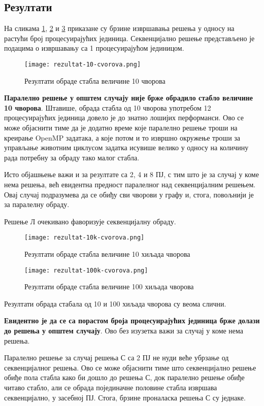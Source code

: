 \subsection{Резултати}

На сликама \ref{fig:rez10}, \ref{fig:rez10k} и \ref{fig:rez100k} приказане су брзине извршавања решења у односу на растући број процесуирајућих јединица.
Секвенцијално решење представљено је подацима о извршавању са 1 процесуирајућом јединицом.

\begin{figure}[]
    \centering
    \texttt{[image: rezultat-10-cvorova.png]}
    \caption{Резултати обраде стабла величине 10 чворова}
    \label{fig:rez10}
\end{figure}

\textbf{Паралелно решење у општем случају није брже обрадило стабло величине 10 чворова}.
Штавише, обрада стабла од 10 чворова употребом 12 процесуирајућих јединица довело је до знатно лошијих перформанси.
Ово се може објаснити тиме да је додатно време које паралелно решење троши на креирање OpenMP задатака, а које потом и то извршно окружење троши за
управљање животним циклусом задатка исувише велико у односу на количину рада потребну за обраду тако малог стабла.

Исто објашњење важи и за резултате са 2, 4 и 8 ПЈ, с тим што је за случај у коме нема решења, већ евидентна предност паралелног
над секвенцијалним решењем. Овај случај подразумева да се обиђу сви чворови у графу и, стога, повољнији је за паралелну обраду.

Решење Л очекивано фаворизује секвенцијалну обраду.

\begin{figure}[]
    \centering
    \texttt{[image: rezultat-10k-cvorova.png]}
    \caption{Резултати обраде стабла величине 10 хиљада чворова}
    \label{fig:rez10k}
\end{figure}

\begin{figure}[]
    \centering
    \texttt{[image: rezultat-100k-cvorova.png]}
    \caption{Резултати обраде стабла величине 100 хиљада чворова}
    \label{fig:rez100k}
\end{figure}

Резултати обрада стабала од 10 и 100 хиљада чворова су веома слични.

\textbf{Евидентно је да се са порастом броја процесуирајућих јединица брже долази до решења у општем случају}.
Ово без изузетка важи за случај у коме нема решења.

Паралелно решење за случај решења С са 2 ПЈ не нуди веће убрзање од секвенцијалног решења.
Ово се може објаснити тиме што секвенцијално решење обиђе пола стабла како би дошло до решења С,
док паралелно решење обиђе читаво стабло, али се обрада појединачне половине стабла извршава секвенцијално, у засебној ПЈ.
Стога, брзине проналаска решења С су једнаке.


\pagebreak